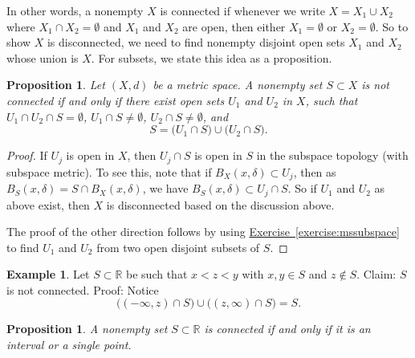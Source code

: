 \documentclass[12pt]{book}
\newcommand{\R}{{\mathbb{R}}}
\theoremstyle{plain}
\newtheorem{prop}[thm]{Proposition}
\theoremstyle{remark}
\theoremstyle{definition}
\theoremstyle{exercise}
\theoremstyle{example}
\newtheorem{example}[thm]{Example}
\newcommand{\exerciseref}[1]{\hyperref[#1]{Exercise~\ref*{#1}}}
\begin{document}
In other words, a nonempty $X$ is connected if whenever we write
$X = X_1 \cup X_2$ where $X_1 \cap X_2 = \emptyset$ and $X_1$ and $X_2$ are
open, then either $X_1 = \emptyset$ or $X_2 = \emptyset$.
So to show $X$ is disconnected, we need to find nonempty
disjoint open sets $X_1$ and
$X_2$ whose union is $X$.  For subsets, we state this idea as a proposition.

\begin{prop}
Let $(X,d)$ be a metric space.
A nonempty set $S \subset X$ is not connected if and only if
there exist open sets $U_1$ and
$U_2$ in $X$, such that $U_1 \cap U_2 \cap S = \emptyset$,
$U_1 \cap S \not= \emptyset$,
$U_2 \cap S \not= \emptyset$, and
\begin{equation*}
S = 
\bigl( U_1 \cap S \bigr)
\cup
\bigl( U_2 \cap S \bigr) .
\end{equation*}
\end{prop}

\begin{proof}
If $U_j$ is open in $X$,
then $U_j \cap S$ is open in $S$ in the subspace topology (with subspace
metric).  To see this,
note that if $B_X(x,\delta) \subset U_j$, then as
$B_S(x,\delta) = S \cap B_X(x,\delta)$,
we have $B_S(x,\delta) \subset U_j \cap S$.
So if $U_1$ and $U_2$ as above exist, then
$X$ is disconnected based on the discussion above.

The proof of the other direction follows by using
\exerciseref{exercise:mssubspace} to find $U_1$ and $U_2$ from two
open disjoint subsets of $S$.
\end{proof}

\begin{example}
Let $S \subset \R$ be such that $x < z < y$ with $x,y \in S$
and $z \notin S$.  Claim: $S$ is not connected.  Proof:  Notice
\begin{equation*}
\bigl( (-\infty,z) \cap S \bigr)
\cup
\bigl( (z,\infty) \cap S \bigr)
= S .
\end{equation*}
\end{example}

\begin{prop}
A nonempty set $S \subset \R$ is connected if and only if it is
an interval or a single point.
\end{prop}
\end{document}
